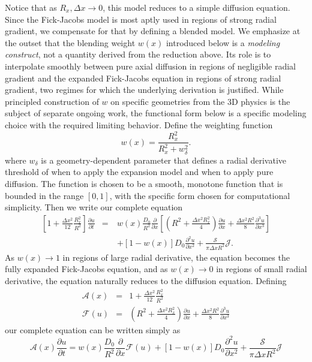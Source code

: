 \documentclass[11pt]{article}
\begin{document}
Notice that as $R_x, \Delta x \to 0$, this model reduces to a simple diffusion equation. Since the Fick-Jacobs model is most aptly used in regions of strong radial gradient, we compensate for that by defining a blended model. We emphasize at the outset that the blending weight $w(x)$ introduced below is a \emph{modeling construct}, not a quantity derived from the reduction above. Its role is to interpolate smoothly between pure axial diffusion in regions of negligible radial gradient and the expanded Fick-Jacobs equation in regions of strong radial gradient, two regimes for which the underlying derivation is justified. While principled construction of $w$ on specific geometries from the 3D physics is the subject of separate ongoing work, the functional form below is a specific modeling choice with the required limiting behavior. Define the weighting function
\begin{equation}
    w(x) = \frac{R_x^2}{R_x^2 + w_\delta^2}.
\end{equation}
where $w_\delta$ is a geometry-dependent parameter that defines a radial derivative threshold of when to apply the expansion model and when to apply pure diffusion. The function is chosen to be a smooth, monotone function that is bounded in the range $[0, 1]$, with the specific form chosen for computational simplicity. Then we write our complete equation
\begin{eqnarray}
     \left[ 1 + \frac{\Delta x^2}{12} \frac{R_x^2}{R^2} \right] \frac{\partial u}{\partial t} &=& w(x)\frac{D_0}{R^2}  \frac{\partial}{\partial x} \left[ \left( R^2 + \frac{\Delta x^2 R_x^2}{4} \right) \frac{\partial u}{\partial x} + \frac{\Delta x^2 R^2}{8} \frac{\partial^3 u}{\partial x^3} \right]  \nonumber \\
     &\quad& + [1-w(x)] D_0 \frac{\partial^2 u}{\partial x^2} + \frac{\mathcal{S}}{\pi\Delta x R^2} \mathcal{J}.
\end{eqnarray}
As $w(x) \to 1$ in regions of large radial derivative, the equation becomes the fully expanded Fick-Jacobs equation, and as $w(x) \to 0$ in regions of small radial derivative, the equation naturally reduces to the diffusion equation. Defining
\begin{eqnarray}
    \mathcal{A}(x) &=& 1 + \frac{\Delta x^2}{12} \frac{R_x^2}{R^2} \\
    \mathcal{F}(u) &=& \left( R^2 + \frac{\Delta x^2 R_x^2}{4} \right) \frac{\partial u}{\partial x} + \frac{\Delta x^2 R^2}{8} \frac{\partial^3 u}{\partial x^3}
\end{eqnarray}
our complete equation can be written simply as
\begin{equation}
    \mathcal{A}(x)\frac{\partial u}{\partial t} = w(x) \frac{D_0}{R^2} \frac{\partial}{\partial x} \mathcal{F}(u) + [1 - w(x)] D_0 \frac{\partial^2 u}{\partial x^2} + \frac{\mathcal{S}}{\pi\Delta x R^2} \mathcal{J} \label{eq:dFJ}
\end{equation}
\end{document}
